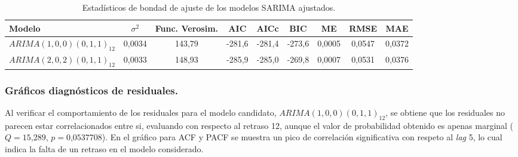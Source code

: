 \documentclass[]{article}
\begin{document}
\begin{table}

\caption{\label{tab:fitting-sarima}Estadísticos de bondad de ajuste de los modelos SARIMA ajustados.}
\centering
\begin{tabular}[t]{l|c|c|c|c|c|c|c|c}
\hline
Modelo & $\sigma^2$ & Func. Verosim. & AIC & AICc & BIC & ME & RMSE & MAE\\
\hline
$ARIMA(1,0,0)(0,1,1)_{12}$ & 0,0034 & 143,79 & -281,6 & -281,4 & -273,6 & 0,0005 & 0,0547 & 0,0372\\
\hline
$ARIMA(2,0,2)(0,1,1)_{12}$ & 0,0033 & 148,93 & -285,9 & -285,0 & -269,8 & 0,0007 & 0,0531 & 0,0376\\
\hline
\end{tabular}
\end{table}

\hypertarget{gruxe1ficos-diagnuxf3sticos-de-residuales.}{%
\subsubsection{Gráficos diagnósticos de residuales.}\label{gruxe1ficos-diagnuxf3sticos-de-residuales.}}

Al verificar el comportamiento de los residuales para el modelo candidato, \(ARIMA(1,0,0)(0,1,1)_{12}\), se obtiene que los residuales no parecen estar correlacionados entre si, evaluando con respecto al retraso 12, aunque el valor de probabilidad obtenido es apenas marginal (\(Q=\text{15,289}\), \(p=\text{0,0537708}\)).
En el gráfico para ACF y PACF se muestra un pico de correlación significativa con respeto al \emph{lag} 5, lo cual indica la falta de un retraso en el modelo considerado.
\end{document}
